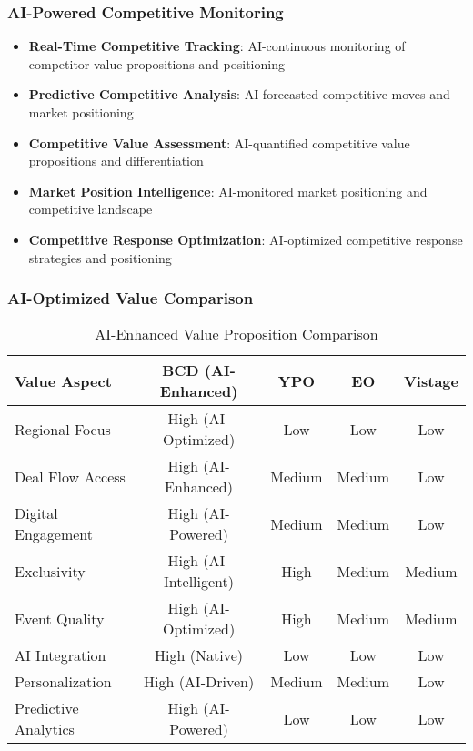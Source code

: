 \subsubsection{AI-Powered Competitive Monitoring}

\begin{itemize}
    \item \textbf{Real-Time Competitive Tracking}: AI-continuous monitoring of competitor value propositions and positioning
    \item \textbf{Predictive Competitive Analysis}: AI-forecasted competitive moves and market positioning
    \item \textbf{Competitive Value Assessment}: AI-quantified competitive value propositions and differentiation
    \item \textbf{Market Position Intelligence}: AI-monitored market positioning and competitive landscape
    \item \textbf{Competitive Response Optimization}: AI-optimized competitive response strategies and positioning
\end{itemize}

\subsubsection{AI-Optimized Value Comparison}

\begin{table}[h]
\centering
\begin{tabular}{|l|c|c|c|c|}
\hline
\textbf{Value Aspect} & \textbf{BCD (AI-Enhanced)} & \textbf{YPO} & \textbf{EO} & \textbf{Vistage} \\
\hline
Regional Focus & High (AI-Optimized) & Low & Low & Low \\
Deal Flow Access & High (AI-Enhanced) & Medium & Medium & Low \\
Digital Engagement & High (AI-Powered) & Medium & Medium & Low \\
Exclusivity & High (AI-Intelligent) & High & Medium & Medium \\
Event Quality & High (AI-Optimized) & High & Medium & Medium \\
AI Integration & High (Native) & Low & Low & Low \\
Personalization & High (AI-Driven) & Medium & Medium & Low \\
Predictive Analytics & High (AI-Powered) & Low & Low & Low \\
\hline
\end{tabular}
\caption{AI-Enhanced Value Proposition Comparison}
\end{table}

